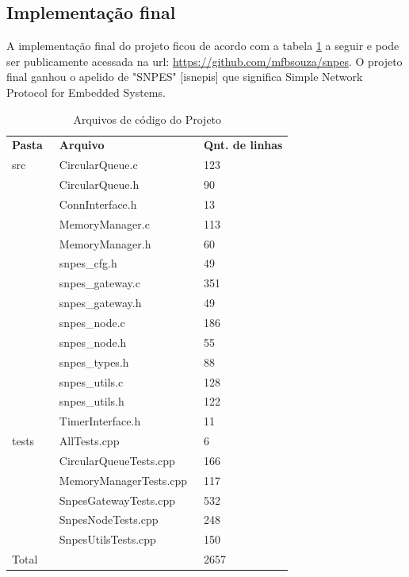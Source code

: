 \subsection{Implementação final}

A implementação final do projeto ficou de acordo com a tabela \ref{tab:files} a seguir
e pode ser publicamente acessada na url: \url{https://github.com/mfbsouza/snpes}. O projeto
final ganhou o apelido de "SNPES" [isnepis] que significa Simple Network Protocol for Embedded
Systems.  

\begin{longtable}{|l|l|l|}
    \caption{Arquivos de código do Projeto}\label{tab:files}\\
    \hline
    \textbf{Pasta} & \
    \textbf{Arquivo} & \
    \textbf{Qnt. de linhas} \\
    \cline{1-3}
    src & \
    CircularQueue.c & \
    123 \\
    \cline{2-3}
     & \
    CircularQueue.h & \
    90 \\
    \cline{2-3}
     & \
    ConnInterface.h & \
    13 \\
    \cline{2-3}
     & \
    MemoryManager.c & \
    113 \\
    \cline{2-3}
     & \
    MemoryManager.h & \
    60 \\
    \cline{2-3}
     & \
    snpes\_cfg.h & \
    49 \\
    \cline{2-3}
     & \
    snpes\_gateway.c & \
    351 \\
    \cline{2-3}
     & \
    snpes\_gateway.h & \
    49 \\
    \cline{2-3}
     & \
    snpes\_node.c & \
    186 \\
    \cline{2-3}
     & \
    snpes\_node.h & \
    55 \\
    \cline{2-3}
     & \
    snpes\_types.h & \
    88 \\
    \cline{2-3}
     & \
    snpes\_utils.c & \
    128 \\
    \cline{2-3}
     & \
    snpes\_utils.h & \
    122 \\
    \cline{2-3}
     & \
    TimerInterface.h & \
    11 \\
    \hline
    
    tests & \
    AllTests.cpp & \
    6 \\
    \cline{2-3}
     & \
    CircularQueueTests.cpp & \
    166 \\
    \cline{2-3}
     & \
    MemoryManagerTests.cpp & \
    117 \\
    \cline{2-3}
     & \
    SnpesGatewayTests.cpp & \
    532 \\
    \cline{2-3}
     & \
    SnpesNodeTests.cpp & \
    248 \\
    \cline{2-3}
     & \
    SnpesUtilsTests.cpp & \
    150 \\
    \hline
    
    Total & \
     & \
    2657 \\
    \hline
\end{longtable}